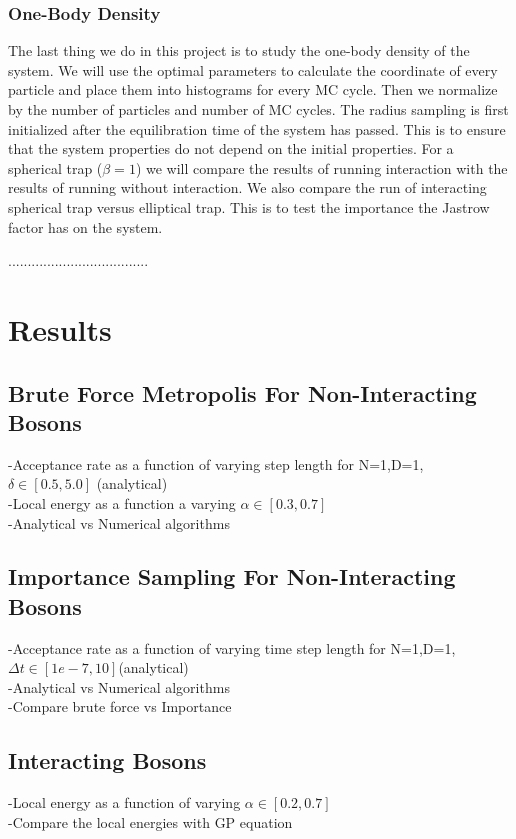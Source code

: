 \documentclass[12pt,a4paper,english]{article}
\begin{document}
\subsubsection{One-Body Density}
\label{subsubsect:Coding_onebody_density}
The last thing we do in this project is to study the one-body density of the system. We will use the optimal parameters to calculate the coordinate of every particle and place them into histograms for every MC cycle. Then we normalize by the number of particles and number of MC cycles. The radius sampling is first initialized after the equilibration time of the system has passed. This is to ensure that the system properties do not depend on the initial properties. For a spherical trap ($\beta=1$) we will compare the results of running interaction with the results of running without interaction. We also compare the run of interacting spherical trap versus elliptical trap. This is to test the importance the Jastrow factor has on the system.

....................................
\section{Results}
\label{sect:Results}
\subsection{Brute Force Metropolis For Non-Interacting Bosons}
\label{subsect:Result_brute_non-int}
-Acceptance rate as a function of varying step length for N=1,D=1, $\delta\in[0.5,5.0]$ (analytical)\\
-Local energy as a function a varying $\alpha\in[0.3,0.7]$\\
-Analytical vs Numerical algorithms
\subsection{Importance Sampling For Non-Interacting Bosons}
\label{subsect:Result_importance_non-int}
-Acceptance rate as a function of varying time step length for N=1,D=1, $\Delta t\in[1e-7,10]$(analytical)\\
-Analytical vs Numerical algorithms\\
-Compare brute force vs Importance
\subsection{Interacting Bosons}
\label{subsect:Results_int}
-Local energy as a function of varying $\alpha\in[0.2,0.7]$\\
-Compare the local energies with GP equation
\end{document}
